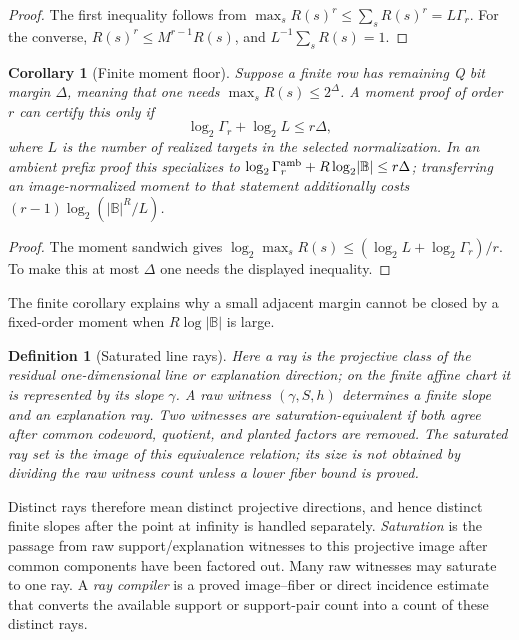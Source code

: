 \documentclass[12pt,a4paper]{amsart}
\numberwithin{equation}{section}
\newtheorem{corollary}[corollary]{Corollary}
\newtheorem{definition}[definition]{Definition}
\theoremstyle{remark}
\newcommand{\B}{\mathbb B}
\newcommand{\abs}[1]{\lvert #1\rvert}
\begin{document}
\begin{proof}
The first inequality follows from \(\max_sR(s)^r\le\sum_sR(s)^r=L\Gamma_r\).  For the converse, \(R(s)^r\le M^{r-1}R(s)\), and \(L^{-1}\sum_sR(s)=1\).
\end{proof}

\begin{corollary}[Finite moment floor]\label{cor:finite-moment-floor}
Suppose a finite row has remaining Q bit margin \(\Delta\), meaning that one needs \(\max_sR(s)\le2^\Delta\).  A moment proof of order \(r\) can certify this only if
\[
        \log_2\Gamma_r+\log_2 L\le r\Delta,
\]
where \(L\) is the number of realized targets in the selected
normalization.  In an ambient prefix proof this specializes to
\(\log_2\Gamma_r^{\rm amb}+R\log_2\abs\B\le r\Delta\); transferring an
image-normalized moment to that statement additionally costs
\((r-1)\log_2(\abs\B^R/L)\).
\end{corollary}

\begin{proof}
The moment sandwich gives \(\log_2\max_sR(s)\le(\log_2L+\log_2\Gamma_r)/r\).  To make this at most \(\Delta\) one needs the displayed inequality.
\end{proof}

The finite corollary explains why a small adjacent margin cannot be closed
by a fixed-order moment when \(R\log\abs\B\) is large.

\begin{definition}[Saturated line rays]\label{def:saturated-line-rays}
Here a \emph{ray} is the projective class of the residual one-dimensional
line or explanation direction; on the finite affine chart it is represented
by its slope \(\gamma\).
A raw witness \((\gamma,S,h)\) determines a finite slope and an explanation
ray.  Two witnesses are saturation-equivalent if both agree after common
codeword, quotient, and planted factors are removed.  The saturated ray set
is the image of this equivalence relation; its size is not obtained by
dividing the raw witness count unless a lower fiber bound is proved.
\end{definition}

Distinct rays therefore mean distinct projective
directions, and hence distinct finite slopes after the point at infinity is
handled separately.  \emph{Saturation} is the passage from raw
support/explanation witnesses to this projective image after common
components have been factored out.  Many raw witnesses may saturate to one
ray.  A \emph{ray compiler} is a proved image--fiber or direct incidence
estimate that converts the available support or support-pair count into a
count of these distinct rays.
\end{document}
